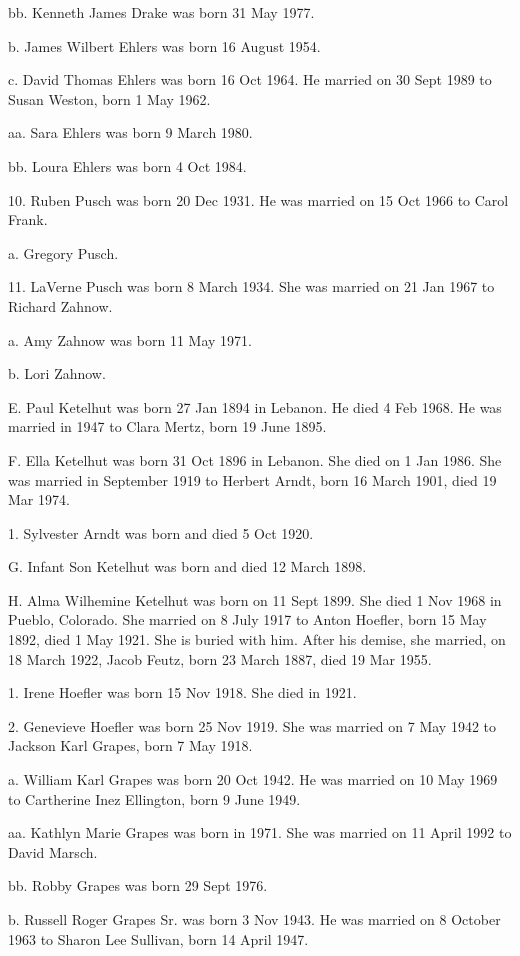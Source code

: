 \documentclass[a4paper]{article}
\begin{document}
bb. Kenneth James Drake was born 31 May 1977.

b. James Wilbert Ehlers was born 16 August 1954.

c. David Thomas Ehlers was born 16 Oct 1964.  He married on 30 Sept 1989 to Susan Weston, born 1 May 1962.

aa. Sara Ehlers was born 9 March 1980.

bb. Loura Ehlers was born 4 Oct 1984.

10. Ruben Pusch was born 20 Dec 1931.  He was married on 15 Oct 1966 to Carol Frank.

a. Gregory Pusch.

11. LaVerne Pusch  was born 8 March 1934.  She was married on 21 Jan 1967 to Richard Zahnow.  

a. Amy Zahnow was born 11 May 1971.

b. Lori Zahnow. 

E. Paul Ketelhut was born 27 Jan 1894 in Lebanon.  He died 4 Feb 1968.  He was married in 1947 to Clara Mertz, born 19 June 1895.  

F. Ella Ketelhut was born 31 Oct 1896 in Lebanon.  She died on 1 Jan 1986.  She was married in September 1919 to Herbert Arndt, born 16 March 1901, died 19 Mar 1974.

1. Sylvester Arndt was born and died 5 Oct 1920.

G. Infant Son Ketelhut was born and died 12 March 1898.

H. Alma Wilhemine Ketelhut was born on 11 Sept 1899.  She died 1 Nov 1968 in Pueblo, Colorado.  She married on 8 July 1917 to Anton Hoefler, born 15 May 1892, died 1 May 1921.  She is buried with him.  After his demise, she married, on 18 March 1922, Jacob Feutz, born 23 March 1887, died 19 Mar 1955.

1. Irene Hoefler was born 15 Nov 1918.  She died in 1921.

2. Genevieve Hoefler was born 25 Nov 1919.  She was married on 7 May 1942  to Jackson Karl Grapes, born 7 May 1918.

a. William Karl Grapes was born 20 Oct 1942.  He was married on 10 May 1969 to Cartherine Inez Ellington, born 9 June 1949.

aa. Kathlyn Marie Grapes was born in 1971.  She was married on 11 April 1992 to David Marsch.

bb. Robby Grapes was born 29 Sept 1976.

b. Russell Roger Grapes Sr. was born 3 Nov 1943.  He was married on 8 October 1963 to Sharon Lee Sullivan, born 14 April 1947.
\end{document}
